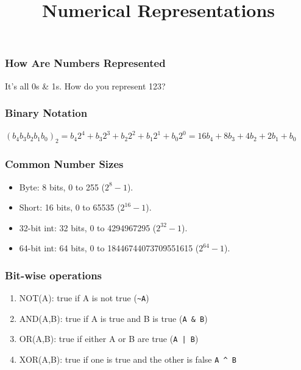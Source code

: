 
\title{Numerical Representations}

\frame{\maketitle}

\begin{frame}[fragile]
\frametitle{How Are Numbers Represented}

It's all 0s \& 1s. How do you represent 123?

\end{frame}

\begin{frame}[fragile]
\frametitle{Binary Notation}

$(b_4b_3b_2b_1b_0)_2 = b_4 2^4 + b_3 2^3 + b_2 2^2 + b_1 2^1 + b_0 2^0 = 16b_4 + 8b_3 + 4b_2 + 2 b_1 + b_0$

\end{frame}

\begin{frame}[fragile]
\frametitle{Common Number Sizes}

\begin{itemize}
\item Byte: 8 bits, 0 to 255 ($2^8-1$).
\item Short: 16 bits, 0 to 65535 ($2^{16}-1$).
\item 32-bit int: 32 bits, 0 to 4294967295 ($2^{32}-1$).
\item 64-bit int: 64 bits, 0 to 18446744073709551615 ($2^{64}-1$).
\end{itemize}
\end{frame}

\begin{frame}[fragile]
\frametitle{Bit-wise operations}

\begin{enumerate}
\item NOT(A): true if A is \alert{not} true (\lstinline{~A})
\item AND(A,B): true if A is true and B is true (\lstinline{A & B})
\item OR(A,B): true if either A or B are true (\lstinline{A | B})
\item XOR(A,B): true if one is true and the other is false \lstinline{A ^ B}
\end{enumerate}

\end{frame}

